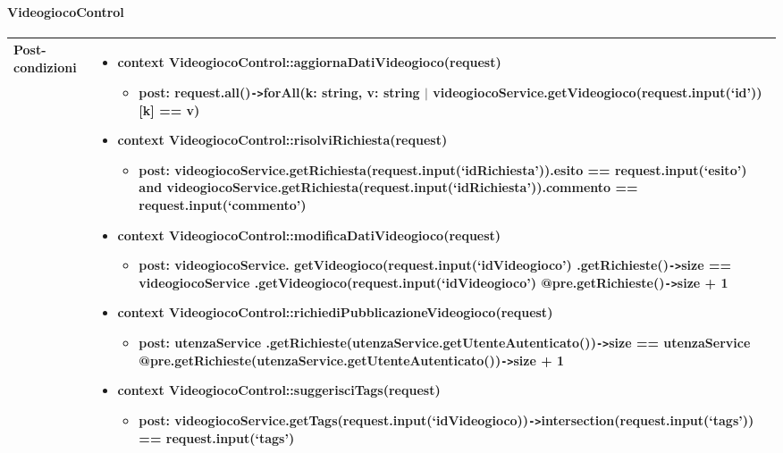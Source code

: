 \paragraph{VideogiocoControl}
\small\begin{tabular}{|| l | p{28em} ||} 
\hline
Post-condizioni & \begin{itemize}[leftmargin=*]
	\item \textbf{context} VideogiocoControl::aggiornaDatiVideogioco(request)
	\begin{itemize}
		\item[ ] \textbf{post:} request.all()\verb|->|forAll(k: string, v: string $|$ videogiocoService.getVideogioco(request.input(‘id’))[k] == v)	
	\end{itemize}

	\item \textbf{context} VideogiocoControl::risolviRichiesta(request)
	\begin{itemize}
		\item[ ] \textbf{post:} videogiocoService.getRichiesta(request.input(‘idRichiesta’)).esito == request.input(‘esito’) and videogiocoService.getRichiesta(request.input(‘idRichiesta’)).commento == request.input(‘commento’)
	\end{itemize}

	\item \textbf{context} VideogiocoControl::modificaDatiVideogioco(request)
	\begin{itemize}
		\item[ ] \textbf{post:} videogiocoService.
		getVideogioco(request.input(‘idVideogioco’)
		.getRichieste()\verb|->|size ==
		videogiocoService
		.getVideogioco(request.input(‘idVideogioco’)
		@pre.getRichieste()\verb|->|size + 1	
	\end{itemize}

	\item \textbf{context} VideogiocoControl\newline ::richiediPubblicazioneVideogioco(request)
	\begin{itemize}
		\item[ ] \textbf{post:} utenzaService
		.getRichieste(utenzaService\newline .getUtenteAutenticato())\verb|->|size ==
		utenzaService
		@pre.getRichieste(utenzaService\newline .getUtenteAutenticato())\verb|->|size + 1	
	\end{itemize}

	\item \textbf{context} VideogiocoControl::suggerisciTags(request)
	\begin{itemize}
		\item[ ] \textbf{post:} videogiocoService\newline .getTags(request.input(‘idVideogioco))\newline \verb|->|intersection(request.input(‘tags’)) == request.input(‘tags’)
	\end{itemize}
\end{itemize}\\
\hline
\end{tabular}

